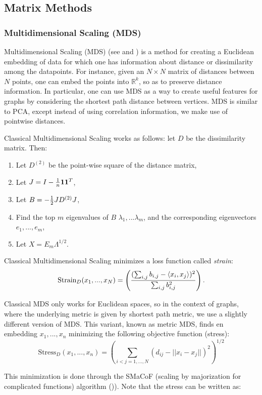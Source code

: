 \subsection{Matrix Methods}
\subsubsection{Multidimensional Scaling (MDS)}
Multidimensional Scaling (MDS) (see \cite{cox2000multidimensional} and \cite{borg2003modern}) is a method for creating a Euclidean embedding of data for which one has information about distance or dissimilarity among the datapoints. For instance, given an $N \times N$ matrix of distances between $N$ points, one can embed the points into $\mathbb{R}^k$, so as to preserve distance information. In particular, one can use MDS as a way to create useful features for graphs by considering the shortest path distance between vertices. MDS is similar to PCA, except instead of using correlation information, we make use of pointwise distances.

Classical Multidimensional Scaling works as follows: let $D$ be the dissimilarity matrix. Then:
\begin{enumerate}
  \item Let $D^{(2)}$ be the point-wise square of the distance matrix,
  \item Let $J = I - {1\over n}{\mathbf{1}}{\mathbf{1}}^T$,
  \item Let $B = -{1 \over 2}JD^{(2)}J$,
  \item Find the top $m$ eigenvalues of $B$ $\lambda_1, ... \lambda_m$, and the corresponding eigenvectors $e_1, ... , e_m$,
  \item Let $X = E_m\Lambda^{1/2}$.
\end{enumerate}

Classical Multidimensional Scaling minimizes a loss function called \emph{strain}:
\[
    \text{Strain}_D(x_1, ... , x_N) = \left( ({\sum_{i,j}b_{i,j}- \langle x_i,x_j \rangle})^2 \over \sum_{i,j}b_{i,j}^2\right).
\]

Classical MDS only works for Euclidean spaces, so in the context of graphs, where the underlying metric is given by shortest path metric, we use a slightly different version of MDS. This variant, known as metric MDS, finds en embedding $x_1, ... , x_n$ minimizing the following objective function (stress):
\[
    \text{Stress}_D(x_1, ... , x_n) = \left(\sum_{i < j = 1, ... ,N}(d_{ij} - ||x_i - x_j||)^2\right)^{1/2}
\]

This minimization is done through the SMaCoF (scaling by majorization for complicated functions) algorithm ()\cite{de2011applications}). Note that the stress can be written as:

